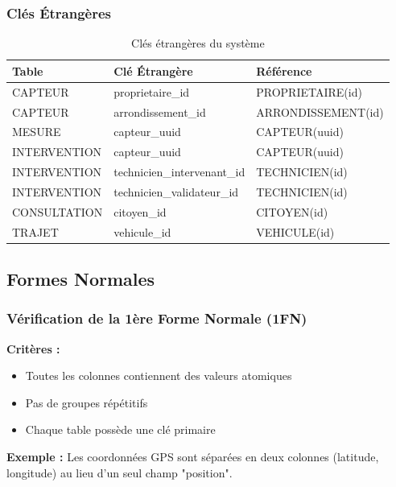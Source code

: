 \documentclass[12pt,a4paper]{article}
\begin{document}
\subsubsection{Clés Étrangères}

\begin{table}[h]
\centering
\begin{tabular}{|l|l|l|}
\hline
\textbf{Table} & \textbf{Clé Étrangère} & \textbf{Référence} \\
\hline
CAPTEUR & proprietaire\_id & PROPRIETAIRE(id) \\
\hline
CAPTEUR & arrondissement\_id & ARRONDISSEMENT(id) \\
\hline
MESURE & capteur\_uuid & CAPTEUR(uuid) \\
\hline
INTERVENTION & capteur\_uuid & CAPTEUR(uuid) \\
\hline
INTERVENTION & technicien\_intervenant\_id & TECHNICIEN(id) \\
\hline
INTERVENTION & technicien\_validateur\_id & TECHNICIEN(id) \\
\hline
CONSULTATION & citoyen\_id & CITOYEN(id) \\
\hline
TRAJET & vehicule\_id & VEHICULE(id) \\
\hline
\end{tabular}
\caption{Clés étrangères du système}
\end{table}

\subsection{Formes Normales}

\subsubsection{Vérification de la 1ère Forme Normale (1FN)}

\textbf{Critères :}
\begin{itemize}
    \item[$\checkmark$] Toutes les colonnes contiennent des valeurs atomiques
    \item[$\checkmark$] Pas de groupes répétitifs
    \item[$\checkmark$] Chaque table possède une clé primaire
\end{itemize}

\textbf{Exemple :} Les coordonnées GPS sont séparées en deux colonnes (latitude, longitude) au lieu d'un seul champ "position".
\end{document}
